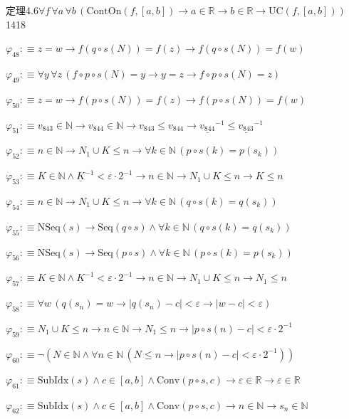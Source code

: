 \begin{fullproof}{定理4.6}{$\forall f\,\forall a\,\forall b\,(\mathrm{ContOn}(f,[a,b]) \to a \in \mathbb{R} \to b \in \mathbb{R} \to \mathrm{UC}(f,[a,b]))$}{1418}
\begin{abbrevlist}
\item $\varphi_{48} :\equiv z = w \to f(q \circ s(N)) = f(z) \to f(q \circ s(N)) = f(w)$
\item $\varphi_{49} :\equiv \forall y\,\forall z\,(f \circ p \circ s(N) = y \to y = z \to f \circ p \circ s(N) = z)$
\item $\varphi_{50} :\equiv z = w \to f(p \circ s(N)) = f(z) \to f(p \circ s(N)) = f(w)$
\item $\varphi_{51} :\equiv v_{843} \in \mathbb{N} \to v_{844} \in \mathbb{N} \to v_{843} \leq v_{844} \to \underline{v_{844}}^{-1} \leq \underline{v_{843}}^{-1}$
\item $\varphi_{52} :\equiv n \in \mathbb{N} \to N_{1} \cup K \leq n \to \forall k \in \mathbb{N}\,(p \circ s(k) = p(s_{k}))$
\item $\varphi_{53} :\equiv K \in \mathbb{N} \land \underline{K}^{-1} < \varepsilon \cdot 2^{-1} \to n \in \mathbb{N} \to N_{1} \cup K \leq n \to K \leq n$
\item $\varphi_{54} :\equiv n \in \mathbb{N} \to N_{1} \cup K \leq n \to \forall k \in \mathbb{N}\,(q \circ s(k) = q(s_{k}))$
\item $\varphi_{55} :\equiv \mathrm{NSeq}(s) \to \mathrm{Seq}(q \circ s) \land \forall k \in \mathbb{N}\,(q \circ s(k) = q(s_{k}))$
\item $\varphi_{56} :\equiv \mathrm{NSeq}(s) \to \mathrm{Seq}(p \circ s) \land \forall k \in \mathbb{N}\,(p \circ s(k) = p(s_{k}))$
\item $\varphi_{57} :\equiv K \in \mathbb{N} \land \underline{K}^{-1} < \varepsilon \cdot 2^{-1} \to n \in \mathbb{N} \to N_{1} \cup K \leq n \to N_{1} \leq n$
\item $\varphi_{58} :\equiv \forall w\,(q(s_{n}) = w \to \lvert q(s_{n}) - c \rvert < \varepsilon \to \lvert w - c \rvert < \varepsilon)$
\item $\varphi_{59} :\equiv N_{1} \cup K \leq n \to n \in \mathbb{N} \to N_{1} \leq n \to \lvert p \circ s(n) - c \rvert < \varepsilon \cdot 2^{-1}$
\item $\varphi_{60} :\equiv \neg (N \in \mathbb{N} \land \forall n \in \mathbb{N}\,(N \leq n \to \lvert p \circ s(n) - c \rvert < \varepsilon \cdot 2^{-1}))$
\item $\varphi_{61} :\equiv \mathrm{SubIdx}(s) \land c \in [a,b] \land \mathrm{Conv}(p \circ s,c) \to \varepsilon \in \mathbb{R} \to \varepsilon \in \mathbb{R}$
\item $\varphi_{62} :\equiv \mathrm{SubIdx}(s) \land c \in [a,b] \land \mathrm{Conv}(p \circ s,c) \to n \in \mathbb{N} \to s_{n} \in \mathbb{N}$

\end{abbrevlist}
\end{fullproof}
